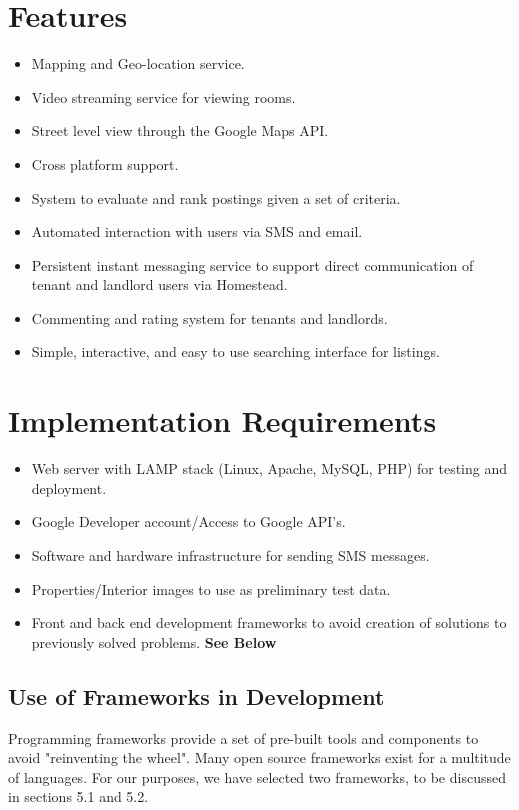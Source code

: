 \documentclass[]{article}
\begin{document}
\section{Features}
\begin{itemize}
	\item Mapping and Geo-location service.
	\item Video streaming service for viewing rooms.
	\item Street level view through the Google Maps API.
	\item Cross platform support.
	\item System to evaluate and rank postings given a set of criteria.
	\item Automated interaction with users via SMS and email.
	\item Persistent instant messaging service to support direct communication of tenant and landlord users via Homestead.
	\item Commenting and rating system for tenants and landlords.
	\item Simple, interactive, and easy to use searching interface for listings.
\end{itemize}

\section{Implementation Requirements}
\begin{itemize}
	\item Web server with LAMP stack (Linux, Apache, MySQL, PHP) for testing and deployment.
	\item Google Developer account/Access to Google API's.
	\item Software and hardware infrastructure for sending SMS messages.
	\item Properties/Interior images to use as preliminary test data.
	\item Front and back end development frameworks to avoid creation of solutions to previously solved problems. \textbf{See Below}
\end{itemize}
\subsection{Use of Frameworks in Development}
Programming frameworks provide a set of pre-built tools and components to avoid "reinventing the wheel". Many open source frameworks exist for a multitude of languages. For our purposes, we have selected two frameworks, to be discussed in sections 5.1 and 5.2.
\end{document}
